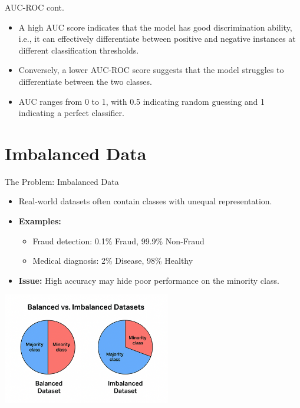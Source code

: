 \documentclass[serif, aspectratio=169]{beamer}
\begin{document}
\begin{frame}{AUC-ROC cont.}
    \begin{itemize}
        \item A high AUC score indicates that the model has good discrimination ability, i.e., it can effectively differentiate between positive and negative instances at different classification thresholds.
        \item Conversely, a lower AUC-ROC score suggests that the model struggles to differentiate between the two classes.
        \item AUC ranges from 0 to 1, with 0.5 indicating random guessing and 1 indicating a perfect classifier.


    \end{itemize}
\end{frame}


\section{Imbalanced Data}

\begin{frame}{The Problem: Imbalanced Data}
    \begin{itemize}\itemsep1em
        \item Real-world datasets often contain classes with unequal representation.
        \item \textbf{Examples:}
        \begin{itemize}
            \item Fraud detection: 0.1\% Fraud, 99.9\% Non-Fraud
            \item Medical diagnosis: 2\% Disease, 98\% Healthy
        \end{itemize}
        \item \textbf{Issue:} High accuracy may hide poor performance on the minority class.
    \end{itemize}
    \begin{center}
        \includegraphics[width=0.55\textwidth]{pic/figure_32.png}\\
    \end{center}
\end{frame}
\end{document}
